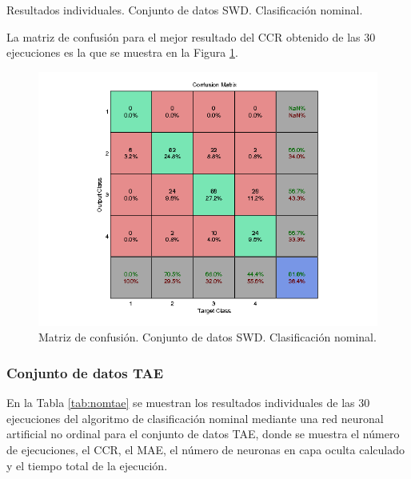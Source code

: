 			\begin{table}[!htbp]
				\centering
				\caption{Resultados individuales. Conjunto de datos SWD. Clasificación nominal.}
				\label{tab:nomswd}
			\end{table}
			
			La matriz de confusión para el mejor resultado del CCR obtenido de las 30 ejecuciones es la que se muestra en la Figura \ref{fig:nomswd}.
			
			\begin{figure}[htbp]
				\centering
				\includegraphics[scale=0.8]{../src/results/nominal/SWD_mc7.png}
				\caption{Matriz de confusión. Conjunto de datos SWD. Clasificación nominal.}
				\label{fig:nomswd}
			\end{figure}

			\subsubsection{Conjunto de datos TAE}
			
			En la Tabla \ref{tab:nomtae} se muestran los resultados individuales de las 30 ejecuciones del algoritmo de clasificación nominal mediante una red neuronal artificial no ordinal para el conjunto de datos TAE, donde se muestra el número de ejecuciones, el CCR, el MAE, el número de neuronas en capa oculta calculado y el tiempo total de la ejecución.\\
			
